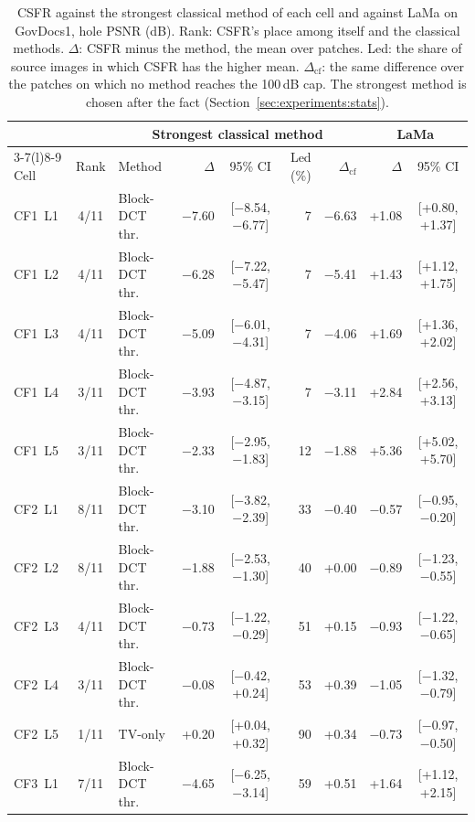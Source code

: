 \documentclass[final,3p]{elsarticle}
\begin{document}
\begin{table}[!t]
\centering
\caption{CSFR against the strongest classical method of each cell and against LaMa on GovDocs1, hole PSNR (dB). Rank: CSFR's place among itself and the classical methods. $\Delta$: CSFR minus the method, the mean over patches. Led: the share of source images in which CSFR has the higher mean. $\Delta_{\mathrm{cf}}$: the same difference over the patches on which no method reaches the 100\,dB cap. The strongest method is chosen after the fact (Section~\ref{sec:experiments:stats}).}
\label{tab:paired-v2}
\footnotesize
\begin{tabular}{@{}l c l r c r r r c@{}}
\toprule
 & & \multicolumn{5}{c}{Strongest classical method} & \multicolumn{2}{c}{LaMa} \\
\cmidrule(lr){3-7}\cmidrule(l){8-9}
Cell & Rank & Method & $\Delta$ & 95\% CI & Led (\%) & $\Delta_{\mathrm{cf}}$ & $\Delta$ & 95\% CI \\
\midrule
CF1~L1 & 4/11 & Block-DCT thr. & $-$7.60 & [$-$8.54, $-$6.77] & 7 & $-$6.63 & +1.08 & [+0.80, +1.37] \\
CF1~L2 & 4/11 & Block-DCT thr. & $-$6.28 & [$-$7.22, $-$5.47] & 7 & $-$5.41 & +1.43 & [+1.12, +1.75] \\
CF1~L3 & 4/11 & Block-DCT thr. & $-$5.09 & [$-$6.01, $-$4.31] & 7 & $-$4.06 & +1.69 & [+1.36, +2.02] \\
CF1~L4 & 3/11 & Block-DCT thr. & $-$3.93 & [$-$4.87, $-$3.15] & 7 & $-$3.11 & +2.84 & [+2.56, +3.13] \\
CF1~L5 & 3/11 & Block-DCT thr. & $-$2.33 & [$-$2.95, $-$1.83] & 12 & $-$1.88 & +5.36 & [+5.02, +5.70] \\
\midrule
CF2~L1 & 8/11 & Block-DCT thr. & $-$3.10 & [$-$3.82, $-$2.39] & 33 & $-$0.40 & $-$0.57 & [$-$0.95, $-$0.20] \\
CF2~L2 & 8/11 & Block-DCT thr. & $-$1.88 & [$-$2.53, $-$1.30] & 40 & +0.00 & $-$0.89 & [$-$1.23, $-$0.55] \\
CF2~L3 & 4/11 & Block-DCT thr. & $-$0.73 & [$-$1.22, $-$0.29] & 51 & +0.15 & $-$0.93 & [$-$1.22, $-$0.65] \\
CF2~L4 & 3/11 & Block-DCT thr. & $-$0.08 & [$-$0.42, +0.24] & 53 & +0.39 & $-$1.05 & [$-$1.32, $-$0.79] \\
CF2~L5 & 1/11 & TV-only & +0.20 & [+0.04, +0.32] & 90 & +0.34 & $-$0.73 & [$-$0.97, $-$0.50] \\
\midrule
CF3~L1 & 7/11 & Block-DCT thr. & $-$4.65 & [$-$6.25, $-$3.14] & 59 & +0.51 & +1.64 & [+1.12, +2.15] \\

\end{tabular}
\end{table}
\end{document}
